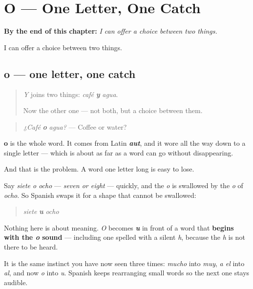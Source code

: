 
\chapter{O --- One Letter, One Catch}
\label{ch:o}

\begin{chapteropening}
\textbf{By the end of this chapter:} \emph{I can offer a choice between two things.}

I can offer a choice between two things.
\end{chapteropening}

\section[o]{o — one letter, one catch}

\label{lesson:ES-C61-o}



\begin{quote}
\emph{Y} joins two things: \emph{café} \emph{\textbf{y}} \emph{agua}.

Now the other one — not both, but a choice between them.
\end{quote}

\begin{cousinweb}
\begin{quote}
\emph{¿Café} \emph{\textbf{o}} \emph{agua?} — Coffee or water?
\end{quote}

\textbf{o} is the whole word. It comes from Latin \emph{\textbf{aut}}, and it wore all the way down to a single letter — which is about as far as a word can go without disappearing.
\end{cousinweb}

\begin{culture}
And that is the problem. A word one letter long is easy to lose.

Say \emph{siete o ocho} — \emph{seven or eight} — quickly, and the \emph{o} is swallowed by the \emph{o} of \emph{ocho}. So Spanish swaps it for a shape that cannot be swallowed:

\begin{quote}
\emph{siete} \emph{\textbf{u}} \emph{ocho}
\end{quote}

Nothing here is about meaning. \emph{O} becomes \emph{\textbf{u}} in front of a word that \textbf{begins with the \emph{o} sound} — including one spelled with a silent \emph{h}, because the \emph{h} is not there to be heard.

It is the same instinct you have now seen three times: \emph{mucho} into \emph{muy}, \emph{a el} into \emph{al}, and now \emph{o} into \emph{u}. Spanish keeps rearranging small words so the next one stays audible.
\end{culture}

